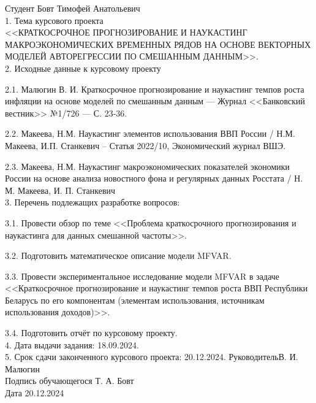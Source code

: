 \documentclass[a4paper, 14pt]{extreport}
\numberwithin{equation}{section}
\numberwithin{equation}{section}
\begin{document}
	\small{    Студент \quad Бовт Тимофей Анатольевич\\[2mm]
		1. Тема курсового проекта\\
		<<КРАТКОСРОЧНОЕ ПРОГНОЗИРОВАНИЕ И НАУКАСТИНГ МАКРОЭКОНОМИЧЕСКИХ ВРЕМЕННЫХ РЯДОВ НА ОСНОВЕ ВЕКТОРНЫХ МОДЕЛЕЙ АВТОРЕГРЕССИИ ПО СМЕШАННЫМ ДАННЫМ>>.\\[6mm]
		2. Исходные данные к курсовому проекту
		
		2.1. Малюгин В. И. Краткосрочное прогнозирование и наукастинг темпов роста инфляции на основе моделей по смешанным данным --- Журнал <<Банковский вестник>> №1/726 --- С. 23-36.
		
		2.2. Макеева, Н.М. Наукастинг элементов использования ВВП России / Н.М. Макеева, И.П. Станкевич -- Статья 2022/10, Экономический журнал ВШЭ.
		
		2.3. Макеева, Н.М. Наукастинг макроэкономических показателей экономики России на основе анализа новостного фона и регулярных данных Росстата / Н. М. Макеева, И. П. Станкевич\\[2mm]
		3. Перечень подлежащих разработке вопросов:
		
		3.1. Провести обзор по теме <<Проблема краткосрочного прогнозирования и наукастинга для данных смешанной частоты>>.
		
		3.2. Подготовить математическое описание модели MFVAR.
		
		3.3. Провести экспериментальное исследование модели MFVAR в задаче <<Краткосрочное прогнозирование и наукастинг темпов роста ВВП Республики Беларусь по его компонентам (элементам использования, источникам использования доходов)>>.
		
		3.4. Подготовить отчёт по курсовому проекту.\\[1cm]
		4. Дата выдачи задания: 18.09.2024.\\[6mm]
		5. Срок сдачи законченного курсового проекта: 20.12.2024.
		\vfill
		\noindent Руководитель\hspace*{3cm}\underline{\hspace*{4cm}}\hspace*{4cm}В. И. Малюгин\\[2mm]
		\noindent Подпись обучающегося\hspace*{1.21cm}\underline{\hspace*{4cm}} \hspace*{3.7cm} Т. А. Бовт\\[2mm]
		Дата \hspace*{12.5cm}20.12.2024     
	}\normalsize
	\newpage
	\tableofcontents
	\newpage
\end{document}
